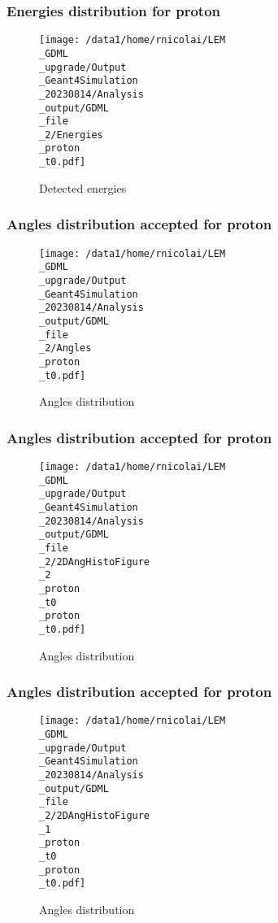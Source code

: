 \documentclass[8pt]{beamer}
\begin{document}
            \begin{frame}
                \frametitle{Energies distribution for proton}
            
        \begin{figure}[h]
            \centering
            \texttt{[image: /data1/home/rnicolai/LEM\\\_GDML\\\_upgrade/Output\\\_Geant4Simulation\\\_20230814/Analysis\\\_output/GDML\\\_file\\\_2/Energies\\\_proton\\\_t0.pdf]}
            \caption{Detected energies}
        \end{figure}
        
            \end{frame}
            
            \begin{frame}
                \frametitle{Angles distribution accepted for proton}
            
        \begin{figure}[h]
            \centering
            \texttt{[image: /data1/home/rnicolai/LEM\\\_GDML\\\_upgrade/Output\\\_Geant4Simulation\\\_20230814/Analysis\\\_output/GDML\\\_file\\\_2/Angles\\\_proton\\\_t0.pdf]}
            \caption{Angles distribution}
        \end{figure}
        
            \end{frame}
            
            \begin{frame}
                \frametitle{Angles distribution accepted for proton}
            
        \begin{figure}[h]
            \centering
            \texttt{[image: /data1/home/rnicolai/LEM\\\_GDML\\\_upgrade/Output\\\_Geant4Simulation\\\_20230814/Analysis\\\_output/GDML\\\_file\\\_2/2DAngHistoFigure\\\_2\\\_proton\\\_t0\\\_proton\\\_t0.pdf]}
            \caption{Angles distribution}
        \end{figure}
        
            \end{frame}
            
            \begin{frame}
                \frametitle{Angles distribution accepted for proton}
            
        \begin{figure}[h]
            \centering
            \texttt{[image: /data1/home/rnicolai/LEM\\\_GDML\\\_upgrade/Output\\\_Geant4Simulation\\\_20230814/Analysis\\\_output/GDML\\\_file\\\_2/2DAngHistoFigure\\\_1\\\_proton\\\_t0\\\_proton\\\_t0.pdf]}
            \caption{Angles distribution}
        \end{figure}
        
            \end{frame}
            
\end{document}
